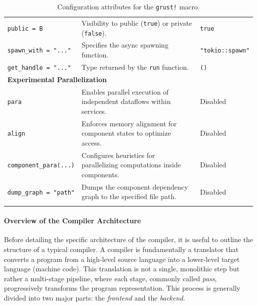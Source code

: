\begin{longtable}{
    l %
    >{\raggedright}p{} %
    l %
    }
    \midrule
    \texttt{public = B}           & Visibility to public (\texttt{true}) or private (\texttt{false}).                & \texttt{true}           \\
    \texttt{spawn\_with = "..."}  & Specifies the async spawning function.                                           & \texttt{"tokio::spawn"} \\
    \texttt{get\_handle = "..."}  & Type returned by the \verb|run| function.                                        & \verb|()|               \\
    \midrule
    \multicolumn{3}{l}{\textbf{Experimental Parallelization}}                                                                                  \\
    \midrule
    \texttt{para}                 & Enables parallel execution of independent dataflows within services.             & Disabled                \\
    \texttt{align}                & Enforces memory alignment for component states to optimize access.               & Disabled                \\
    \texttt{component\_para(...)} & Configures heuristics for parallelizing computations inside components.          & Disabled                \\
    \texttt{dump\_graph = "path"} & Dumps the component dependency graph to the specified file path.                 & Disabled                \\
    \bottomrule
    \caption[Configuration attributes for the \texttt{grust!} macro.]%
    {Configuration attributes for the \texttt{grust!} macro.}
    \label{tab:grust:implem:choices:architecture:usage:configs}                                                                                \\
\end{longtable}

\paragraph{Overview of the Compiler Architecture}
Before detailing the specific architecture of the \GRust compiler, it is useful to outline the
structure of a typical compiler. A compiler is fundamentally a translator that converts a program
from a high-level source language into a lower-level target language (\eg machine code). This
translation is not a single, monolithic step but rather a multi-stage pipeline, where each stage,
commonly called \emph{pass}, progressively transforms the program representation. This process is
generally divided into two major parts: the \emph{frontend} and the \emph{backend}.

